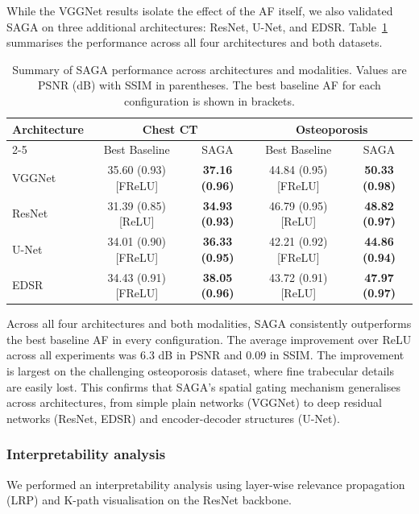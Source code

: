 While the VGGNet results isolate the effect of the AF itself, we also validated SAGA on three additional architectures: ResNet, U-Net, and EDSR. Table~\ref{tab:saga_summary} summarises the performance across all four architectures and both datasets.

\begin{table}[H]
	\centering
	\caption{Summary of SAGA performance across architectures and modalities. Values are PSNR (dB) with SSIM in parentheses. The best baseline AF for each configuration is shown in brackets.}
	\label{tab:saga_summary}
	\begin{tabular}{lcccc}
		\toprule
		\multirow{2}{*}{Architecture} & \multicolumn{2}{c}{Chest CT} & \multicolumn{2}{c}{Osteoporosis} \\
		\cline{2-5}
		& Best Baseline & SAGA & Best Baseline & SAGA \\
		\midrule
		VGGNet & 35.60 (0.93) [FReLU] & \textbf{37.16 (0.96)} & 44.84 (0.95) [FReLU] & \textbf{50.33 (0.98)} \\
		ResNet & 31.39 (0.85) [ReLU] & \textbf{34.93 (0.93)} & 46.79 (0.95) [ReLU] & \textbf{48.82 (0.97)} \\
		U-Net & 34.01 (0.90) [FReLU] & \textbf{36.33 (0.95)} & 42.21 (0.92) [FReLU] & \textbf{44.86 (0.94)} \\
		EDSR & 34.43 (0.91) [FReLU] & \textbf{38.05 (0.96)} & 43.72 (0.91) [ReLU] & \textbf{47.97 (0.97)} \\
		\bottomrule
	\end{tabular}
\end{table}

Across all four architectures and both modalities, SAGA consistently outperforms the best baseline AF in every configuration. The average improvement over ReLU across all experiments was 6.3 dB in PSNR and 0.09 in SSIM. The improvement is largest on the challenging osteoporosis dataset, where fine trabecular details are easily lost. This confirms that SAGA's spatial gating mechanism generalises across architectures, from simple plain networks (VGGNet) to deep residual networks (ResNet, EDSR) and encoder-decoder structures (U-Net).

\subsubsection{Interpretability analysis}

We performed an interpretability analysis using layer-wise relevance propagation (LRP) \citep{montavon2018methods} and K-path visualisation \citep{bhati2025neural} on the ResNet backbone.


